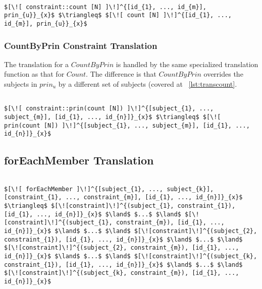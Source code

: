 \lstset{mathescape, language=AST}  
\begin{lstlisting}[frame=single, caption={Constraint Translation {$\colon$} Count},label={lst:transconstraintCount}]

$[\![ constraint::count [N] ]\!]^{[id_{1}, ..., id_{m}], prin_{u}}_{x}$ $\triangleq$ $[\![ count [N] ]\!]^{[id_{1}, ..., id_{m}], prin_{u}}_{x}$ 
\end{lstlisting}

\subsubsection{CountByPrin Constraint Translation}
The translation for a $CountByPrin$ is handled by the same specialized translation function as that for $Count$. The difference is that $CountByPrin$ overrides the subjects in $prin_{u}$ by a different set of subjects (covered at ~\ref{lst:transcount}.

\lstset{mathescape, language=AST}  
\begin{lstlisting}[frame=single, caption={Constraint Translation {$\colon$} Count by Principal},label={lst:transconstraintCountbyPrin}]

$[\![ constraint::prin(count [N]) ]\!]^{[subject_{1}, ..., subject_{m}], [id_{1}, ..., id_{n}]}_{x}$ $\triangleq$ $[\![ prin(count [N]) ]\!]^{[subject_{1}, ..., subject_{m}], [id_{1}, ..., id_{n}]}_{x}$ 
\end{lstlisting}


\subsection{forEachMember Translation}

\lstset{mathescape, language=AST}  
\begin{lstlisting}[frame=single, caption={ForEachMember Translation {$\colon$} Count by Principal},label={lst:transforEachMember}]

$[\![ forEachMember ]\!]^{[subject_{1}, ..., subject_{k}], [constraint_{1}, ..., constraint_{m}], [id_{1}, ..., id_{n}]}_{x}$ $\triangleq$ $[\![constraint]\!]^{(subject_{1}, constraint_{1}), [id_{1}, ..., id_{n}]}_{x}$ $\land$ $...$ $\land$ $[\![constraint]\!]^{(subject_{1}, constraint_{m}), [id_{1}, ..., id_{n}]}_{x}$ $\land$ $...$ $\land$ $[\![constraint]\!]^{(subject_{2}, constraint_{1}), [id_{1}, ..., id_{n}]}_{x}$ $\land$ $...$ $\land$ $[\![constraint]\!]^{(subject_{2}, constraint_{m}), [id_{1}, ..., id_{n}]}_{x}$ $\land$ $...$ $\land$ $[\![constraint]\!]^{(subject_{k}, constraint_{1}), [id_{1}, ..., id_{n}]}_{x}$ $\land$ $...$ $\land$ $[\![constraint]\!]^{(subject_{k}, constraint_{m}), [id_{1}, ..., id_{n}]}_{x}$ 

\end{lstlisting}

